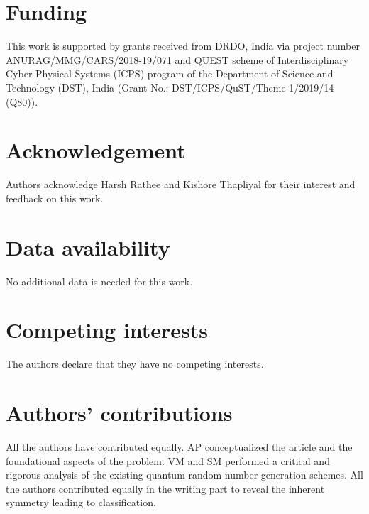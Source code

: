 \documentclass[]{interact}
\theoremstyle{plain}%
\theoremstyle{definition}
\theoremstyle{remark}
\begin{document}

\section*{Funding}
This work is  supported by grants received from DRDO, India via project number ANURAG/MMG/CARS/2018-19/071 and QUEST scheme of Interdisciplinary Cyber Physical Systems (ICPS) program of the Department of Science and Technology (DST), India (Grant No.: DST/ICPS/QuST/Theme-1/2019/14 (Q80)).

\section*{Acknowledgement}
Authors acknowledge Harsh Rathee and Kishore Thapliyal for their interest and feedback on this work.

\section*{Data availability}
No additional data is needed for this work.

\section*{Competing interests}
The authors declare that they have no competing interests.

\section*{Authors’ contributions}

All the authors have contributed equally. AP conceptualized the article and the foundational aspects of the problem. VM and SM performed a critical and rigorous analysis of the existing quantum random number generation schemes. All the authors contributed equally in the writing part to reveal the inherent symmetry leading to classification.


\end{document}
